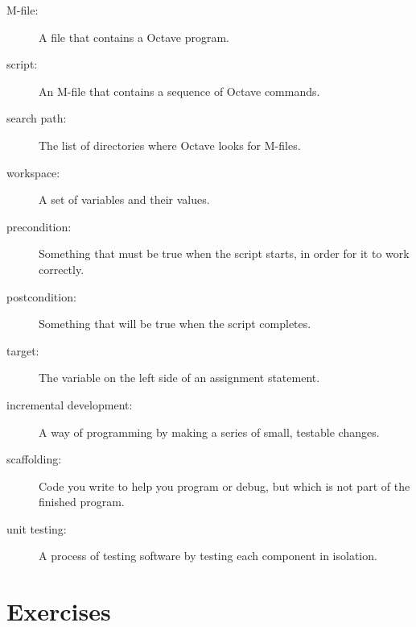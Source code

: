 \documentclass{book}
\begin{document}
\begin{description}

\item[M-file:] A file that contains a Octave program. 

\item[script:] An M-file that contains a sequence of Octave commands.

\item[search path:] The list of directories where Octave looks for
M-files. 

\item[workspace:] A set of variables and their values. 

\item[precondition:] Something that must be true when the script
starts, in order for it to work correctly.

\item[postcondition:] Something that will be true when the script
completes.

\item[target:] The variable on the left side of an assignment statement. 

\item[incremental development:] A way of programming by making a series
of small, testable changes. 

\item[scaffolding:] Code you write to help you program or debug, but
which is not part of the finished program. 

\item[unit testing:] A process of testing software by testing each
component in isolation.

\end{description}


\section{Exercises}
\end{document}
